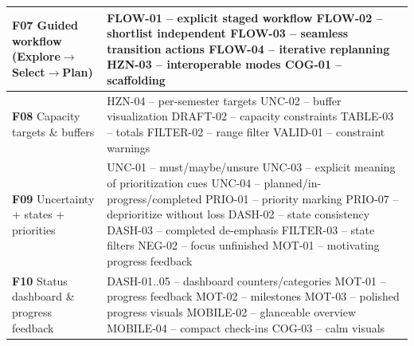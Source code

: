 \begin{longtable}{p{4.5cm} p{10cm}}
\textbf{F07} Guided workflow (Explore$\rightarrow$Select$\rightarrow$Plan) &
FLOW-01 -- explicit staged workflow \newline
FLOW-02 -- shortlist independent \newline
FLOW-03 -- seamless transition actions \newline
FLOW-04 -- iterative replanning \newline
HZN-03 -- interoperable modes \newline
COG-01 -- scaffolding \\
\midrule

\textbf{F08} Capacity targets \& buffers &
HZN-04 -- per-semester targets \newline
UNC-02 -- buffer visualization \newline
DRAFT-02 -- capacity constraints \newline
TABLE-03 -- totals \newline
FILTER-02 -- range filter \newline
VALID-01 -- constraint warnings \\
\midrule

\textbf{F09} Uncertainty + states + priorities &
UNC-01 -- must/maybe/unsure \newline
UNC-03 -- explicit meaning of prioritization cues \newline
UNC-04 -- planned/in-progress/completed \newline
PRIO-01 -- priority marking \newline
PRIO-07 -- deprioritize without loss \newline
DASH-02 -- state consistency \newline
DASH-03 -- completed de-emphasis \newline
FILTER-03 -- state filters \newline
NEG-02 -- focus unfinished \newline
MOT-01 -- motivating progress feedback \\
\midrule

\textbf{F10} Status dashboard \& progress feedback &
DASH-01..05 -- dashboard counters/categories \newline
MOT-01 -- progress feedback \newline
MOT-02 -- milestones \newline
MOT-03 -- polished progress visuals \newline
MOBILE-02 -- glanceable overview \newline
MOBILE-04 -- compact check-ins \newline
COG-03 -- calm visuals \\
\midrule


\end{longtable}
